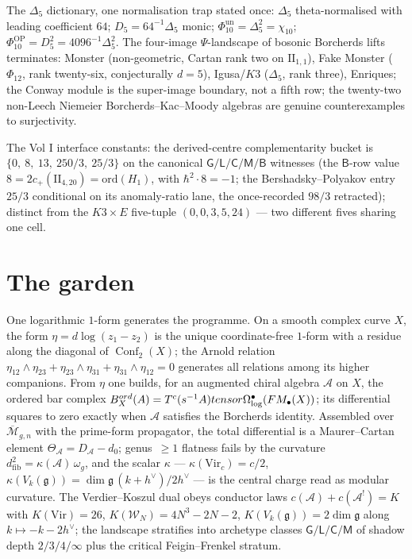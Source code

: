 \documentclass[11pt]{article}
\providecommand{\cA}{\mathcal{A}}
\providecommand{\cW}{\mathcal{W}}
\providecommand{\fg}{\mathfrak{g}}
\providecommand{\barB}{\overline{B}}
\providecommand{\Mbar}{\overline{\mathcal{M}}}
\providecommand{\FM}{\overline{\mathrm{FM}}}
\providecommand{\Vir}{\mathrm{Vir}}
\providecommand{\Dfive}{\Delta_5}
\providecommand{\Phiten}{\Phi_{10}}
\providecommand{\Conf}{\operatorname{Conf}}
\begin{document}
The $\Dfive$ dictionary, one normalisation trap stated once:
$\Dfive$ theta-normalised with leading coefficient $64$;
$D_5=64^{-1}\Dfive$ monic; $\Phiten^{\mathrm{un}}=\Dfive^2=\chi_{10}$;
$\Phiten^{\mathrm{OP}}=D_5^2=4096^{-1}\Dfive^2$. The four-image
$\Psi$-landscape of bosonic Borcherds lifts terminates: Monster
\textup{(non-geometric, Cartan rank two on $\mathrm{II}_{1,1}$)}, Fake
Monster \textup{($\Phi_{12}$, rank twenty-six, conjecturally $d=5$)},
Igusa/$K3$ \textup{($\Dfive$, rank three)}, Enriques; the Conway
module is the super-image boundary, not a fifth row; the twenty-two
non-Leech Niemeier Borcherds--Kac--Moody algebras are genuine
counterexamples to surjectivity.

The Vol I interface constants: the derived-centre complementarity
bucket is $\{0,\ 8,\ 13,\ 250/3,\ 25/3\}$ on the canonical
$\mathsf G/\mathsf L/\mathsf C/\mathsf M/\mathsf B$ witnesses
\textup{(the $\mathsf B$-row value $8=2c_+(\mathrm{II}_{4,20})
=\mathrm{ord}(H_1)$, with $\hbar^2\cdot8=-1$; the Bershadsky--Polyakov
entry $25/3$ conditional on its anomaly-ratio lane, the once-recorded
$98/3$ retracted)}; distinct from the $K3\times E$ five-tuple
$(0,0,3,5,24)$ --- two different fives sharing one cell.

\section{The garden}\label{sec:garden}

One logarithmic $1$-form generates the programme. On a smooth complex
curve $X$, the form $\eta=d\log(z_1-z_2)$ is the unique
coordinate-free $1$-form with a residue along the diagonal of
$\Conf_2(X)$; the Arnold relation
$\eta_{12}\wedge\eta_{23}+\eta_{23}\wedge\eta_{31}
+\eta_{31}\wedge\eta_{12}=0$ generates all relations among its higher
companions. From $\eta$ one builds, for an augmented chiral algebra
$\cA$ on $X$, the ordered bar complex
$\barB^{\mathrm{ord}}_X(\cA)=T^c(s^{-1}\bar\cA)\otimes
\Omega^\bullet_{\log}(\FM_\bullet(X))$; its differential squares to
zero exactly when $\cA$ satisfies the Borcherds identity. Assembled
over $\Mbar_{g,n}$ with the prime-form propagator, the total
differential is a Maurer--Cartan element $\Theta_\cA=D_\cA-d_0$;
genus~$\ge1$ flatness fails by the curvature
$d^2_{\mathrm{fib}}=\kappa(\cA)\,\omega_g$, and the scalar $\kappa$
--- $\kappa(\Vir_c)=c/2$,
$\kappa(V_k(\fg))=\dim\fg\,(k+h^\vee)/2h^\vee$ --- is the central
charge read as modular curvature. The Verdier--Koszul dual obeys
conductor laws $c(\cA)+c(\cA^!)=K$ with $K(\Vir)=26$,
$K(\cW_N)=4N^3-2N-2$, $K(V_k(\fg))=2\dim\fg$ along
$k\mapsto-k-2h^\vee$; the landscape stratifies into archetype classes
$\mathsf G/\mathsf L/\mathsf C/\mathsf M$ of shadow depth
$2/3/4/\infty$ plus the critical Feigin--Frenkel stratum.
\end{document}
